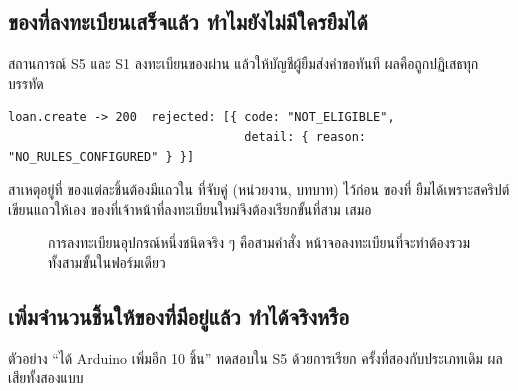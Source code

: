 \subsection{ของที่ลงทะเบียนเสร็จแล้ว ทำไมยังไม่มีใครยืมได้}

สถานการณ์ S5 และ S1 ลงทะเบียนของผ่าน  แล้วให้บัญชีผู้ยืมส่งคำขอทันที ผลคือถูกปฏิเสธทุกบรรทัด

\begin{lstlisting}
loan.create -> 200  rejected: [{ code: "NOT_ELIGIBLE",
                                 detail: { reason: "NO_RULES_CONFIGURED" } }]
\end{lstlisting}

สาเหตุอยู่ที่  ของแต่ละชิ้นต้องมีแถวใน  ที่จับคู่
(หน่วยงาน, บทบาท) ไว้ก่อน ของที่  ยืมได้เพราะสคริปต์  เขียนแถวให้เอง
ของที่เจ้าหน้าที่ลงทะเบียนใหม่จึงต้องเรียกขั้นที่สาม  เสมอ

\begin{figure}[H]
\centering
{}
\caption{การลงทะเบียนอุปกรณ์หนึ่งชนิดจริง ๆ คือสามคำสั่ง หน้าจอลงทะเบียนที่จะทำต้องรวมทั้งสามขั้นในฟอร์มเดียว}
\end{figure}

\subsection{เพิ่มจำนวนชิ้นให้ของที่มีอยู่แล้ว ทำได้จริงหรือ}

ตัวอย่าง ``ได้ Arduino เพิ่มอีก 10 ชิ้น'' ทดสอบใน S5 ด้วยการเรียก  ครั้งที่สองกับประเภทเดิม ผลเสียทั้งสองแบบ

